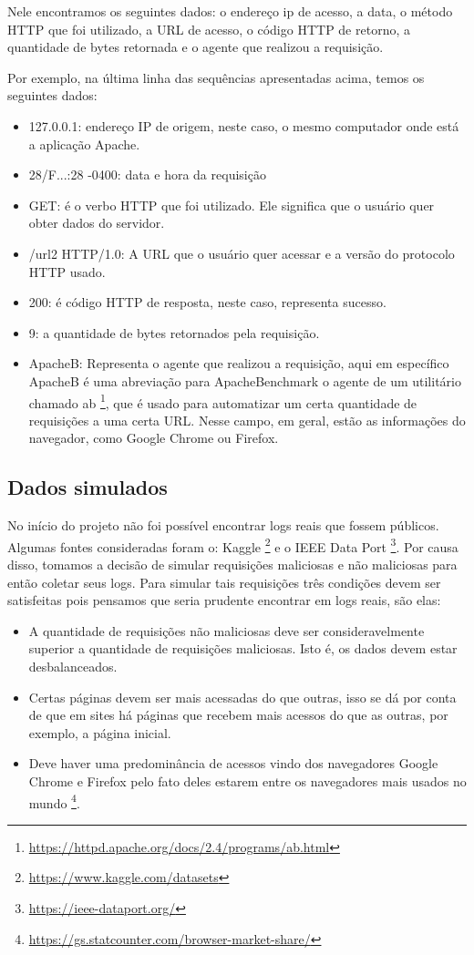 Nele encontramos os seguintes dados: o endereço ip de acesso, a data, o método HTTP que foi utilizado, 
a URL de acesso, o código HTTP de retorno, a quantidade de bytes retornada e o agente que realizou a requisição.

Por exemplo, na última linha das sequências apresentadas acima, temos os seguintes dados:

\begin{itemize}
    \item 127.0.0.1: endereço IP de origem, neste caso, o mesmo computador onde está a aplicação Apache.
    \item 28/F...:28 -0400: data e hora da requisição
    \item GET: é o verbo HTTP que foi utilizado. Ele significa que o usuário quer obter dados do servidor.
    \item /url2 HTTP/1.0: A URL que o usuário quer acessar e a versão do protocolo HTTP usado.
    \item 200: é código HTTP de resposta, neste caso, representa sucesso.
    \item 9: a quantidade de bytes retornados pela requisição. 
    \item ApacheB: Representa o agente que realizou a requisição, aqui em específico ApacheB é uma
    abreviação para ApacheBenchmark o agente de um utilitário chamado ab \footnote{\url{https://httpd.apache.org/docs/2.4/programs/ab.html}}, 
    que é usado para automatizar um certa quantidade de requisições a uma certa URL.
    Nesse campo, em geral, estão as informações do navegador, como Google Chrome ou Firefox.
\end{itemize}


\subsection{Dados simulados}

No início do projeto não foi possível encontrar logs reais que fossem públicos. Algumas fontes
consideradas foram o: Kaggle \footnote{\url{https://www.kaggle.com/datasets}} e o IEEE Data Port 
\footnote{\url{https://ieee-dataport.org/}}. Por causa disso, tomamos a decisão de simular requisições maliciosas 
e não maliciosas para então coletar seus logs. Para simular tais requisições três condições devem 
ser satisfeitas pois pensamos que seria prudente encontrar em logs reais, são elas:

\begin{itemize}
    \item A quantidade de requisições não maliciosas deve ser consideravelmente
    superior a quantidade de requisições maliciosas. Isto é, os dados devem estar desbalanceados.
    \item Certas páginas devem ser mais acessadas do que outras, isso se dá por conta 
    de que em sites há páginas que recebem mais acessos do que as outras, por exemplo, a página inicial.
    \item Deve haver uma predominância de acessos vindo dos navegadores Google Chrome e Firefox pelo fato 
    deles estarem entre os navegadores mais usados no mundo \footnote{\url{https://gs.statcounter.com/browser-market-share/}}.
\end{itemize}

